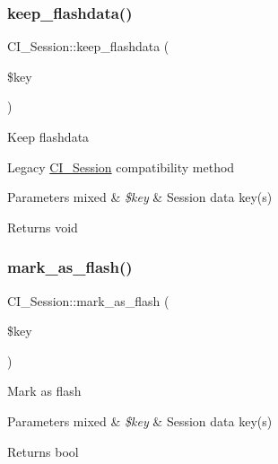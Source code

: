 \subsubsection{\texorpdfstring{keep\+\_\+flashdata()}{keep\_flashdata()}}
{\footnotesize\ttfamily C\+I\+\_\+\+Session\+::keep\+\_\+flashdata (\begin{DoxyParamCaption}\item[{}]{\$key }\end{DoxyParamCaption})}

Keep flashdata

Legacy \mbox{\hyperlink{class_c_i___session}{C\+I\+\_\+\+Session}} compatibility method


\begin{DoxyParams}[1]{Parameters}
mixed & {\em \$key} & Session data key(s) \\
\hline
\end{DoxyParams}
\begin{DoxyReturn}{Returns}
void 
\end{DoxyReturn}
\mbox{\label{class_c_i___session_a4c86053a064c562ff5328b531174e9d3}} 
\subsubsection{\texorpdfstring{mark\+\_\+as\+\_\+flash()}{mark\_as\_flash()}}
{\footnotesize\ttfamily C\+I\+\_\+\+Session\+::mark\+\_\+as\+\_\+flash (\begin{DoxyParamCaption}\item[{}]{\$key }\end{DoxyParamCaption})}

Mark as flash


\begin{DoxyParams}[1]{Parameters}
mixed & {\em \$key} & Session data key(s) \\
\hline
\end{DoxyParams}
\begin{DoxyReturn}{Returns}
bool 
\end{DoxyReturn}
\mbox{\label{class_c_i___session_a8b76c8a0fc2a58819b26b0bba723354c}} 
